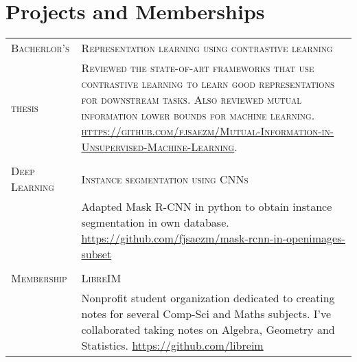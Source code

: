 \documentclass[a4paper,11pt]{article} %
\begin{document}
\section{Projects and Memberships}

\begin{tabular}{p{3cm}|p{11cm}}
  \textsc{Bacherlor's}               & \textsc{Representation learning using contrastive learning}                                                                                                                                                                                                           \\
  \textsc{thesis} & \footnotesize \textsc{Reviewed the state-of-art frameworks that use contrastive learning to learn good representations for downstream tasks. Also reviewed mutual information lower bounds for machine learning. \url{https://github.com/fjsaezm/Mutual-Information-in-Unsupervised-Machine-Learning}}.                                                              \\


  \multicolumn{2}{c}{}                                                                                                                                                                                                                                                                \\

  \textsc{Deep Learning} & \textsc{Instance segmentation using CNNs} \\
                                         & \footnotesize Adapted Mask R-CNN in python to obtain instance segmentation in own database. \url{https://github.com/fjsaezm/mask-rcnn-in-openimages-subset} \\


  \multicolumn{2}{c}{}                                                                                                                                                                                                                                                                \\
  \textsc{Membership}                    & \textsc{LibreIM}                                                                                                                                                                                                                           \\
                                         & \footnotesize Nonprofit student organization dedicated to creating notes for several Comp-Sci and Maths subjects. I've collaborated taking notes on Algebra, Geometry and Statistics.
  \url{https://github.com/libreim}                                                                                                                                                                                                        \\


\end{tabular}
\end{document}
